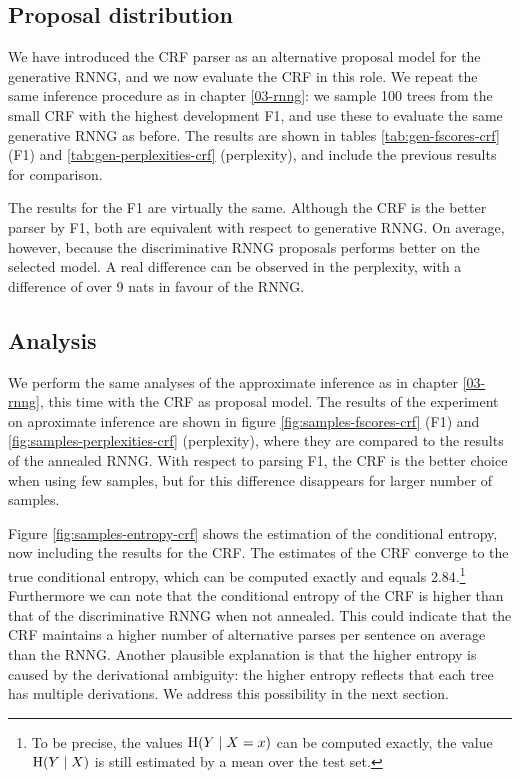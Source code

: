   \subsection{Proposal distribution}
    We have introduced the CRF parser as an alternative proposal model for the generative RNNG, and we now evaluate the CRF in this role. We repeat the same inference procedure as in chapter \ref{03-rnng}: we sample 100 trees from the small CRF with the highest development F1, and use these to evaluate the same generative RNNG as before. The results are shown in tables \ref{tab:gen-fscores-crf} (F1) and \ref{tab:gen-perplexities-crf} (perplexity), and include the previous results for comparison.

    

    

    The results for the F1 are virtually the same. Although the CRF is the better parser by F1, both are equivalent with respect to generative RNNG. On average, however, because the discriminative RNNG proposals performs better on the selected model. A real difference can be observed in the perplexity, with a difference of over 9 nats in favour of the RNNG.

  \subsection{Analysis}

    We perform the same analyses of the approximate inference as in chapter \ref{03-rnng}, this time with the CRF as proposal model. The results of the experiment on aproximate inference are shown in figure \ref{fig:samples-fscores-crf} (F1) and \ref{fig:samples-perplexities-crf} (perplexity), where they are compared to the results of the annealed RNNG. With respect to parsing F1, the CRF is the better choice when using few samples, but for this difference disappears for larger number of samples.

    Figure \ref{fig:samples-entropy-crf} shows the estimation of the conditional entropy, now including the results for the CRF. The estimates of the CRF converge to the true conditional entropy, which can be computed exactly and equals 2.84.\footnote{To be precise, the values $\operatorname{H}(Y \mid X = x)$ can be computed exactly, the value $\operatorname{H}(Y \mid X)$ is still estimated by a mean over the test set.} Furthermore we can note that the conditional entropy of the CRF is higher than that of the discriminative RNNG when not annealed. This could indicate that the CRF maintains a higher number of alternative parses per sentence on average than the RNNG. Another plausible explanation is that the higher entropy is caused by the derivational ambiguity: the higher entropy reflects that each tree has multiple derivations. We address this possibility in the next section.

